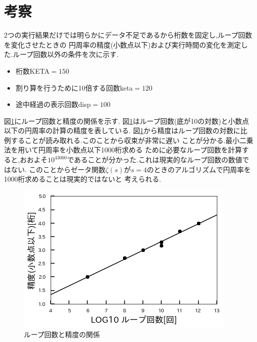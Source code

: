 \documentclass[a4j] {jarticle}
\begin{document}
    \section{考察}
    2つの実行結果だけでは明らかにデータ不足であるから桁数を固定し,ループ回数を変化させたときの
    円周率の精度(小数点以下)および実行時間の変化を測定した.ループ回数以外の条件を次に示す.
    \begin{itemize}
        \item 桁数KETA$=150$
        \item 割り算を行うために10倍する回数keta$=120$
        \item 途中経過の表示回数disp$=100$
      \end{itemize}

    図\ref{loop_seido}にループ回数と精度の関係を示す.
    図\ref{loop_seido}はループ回数(底が10の対数)と小数点以下の円周率の計算の精度を表している.
    図\ref{loop_seido}から精度はループ回数の対数に比例することが読み取れる.このことから収束が非常に遅い
    ことが分かる.最小二乗法を用いて円周率を小数点以下1000桁求める
    ために必要なループ回数を計算すると,おおよそ$10^{43000}$であることが分かった.これは現実的なループ回数の数値ではない.
    このことからゼータ関数$\zeta(s)$が$s=4$のときのアルゴリズムで円周率を1000桁求めることは現実的ではないと
    考えられる.
    \begin{figure}[H]
        \centering
        \includegraphics[scale=0.6]{loop_seido.png}
        \caption{ループ回数と精度の関係}
       \label{loop_seido}
      \end{figure}
\end{document}
